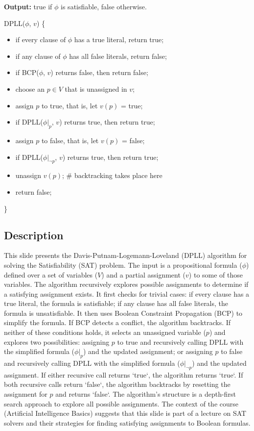 \documentclass{article}%
\begin{document}
\textbf{Output:} true if $\phi$ is satisfiable, false otherwise.

DPLL($\phi$, $v$) \{
\begin{itemize}
    \item if every clause of $\phi$ has a true literal, return true;
    \item if any clause of $\phi$ has all false literals, return false;
    \item if BCP($\phi$, $v$) returns false, then return false;
    \item choose an $p \in V$ that is unassigned in $v$;
    \item assign $p$ to true, that is, let $v(p)$ = true;
    \item if DPLL($\phi|_p$, $v$) returns true, then return true;
    \item assign $p$ to false, that is, let $v(p)$ = false;
    \item if DPLL($\phi|_{\neg p}$, $v$) returns true, then return true;
    \item unassign $v(p)$;  \# backtracking takes place here
    \item return false;
\end{itemize}
\}
%
\subsection{Description}%
This slide presents the Davis-Putnam-Logemann-Loveland (DPLL) algorithm for solving the Satisfiability (SAT) problem.  The input is a propositional formula ($\phi$) defined over a set of variables ($V$) and a partial assignment ($v$) to some of those variables.  The algorithm recursively explores possible assignments to determine if a satisfying assignment exists.  It first checks for trivial cases: if every clause has a true literal, the formula is satisfiable; if any clause has all false literals, the formula is unsatisfiable.  It then uses Boolean Constraint Propagation (BCP) to simplify the formula. If BCP detects a conflict, the algorithm backtracks.  If neither of these conditions holds, it selects an unassigned variable ($p$) and explores two possibilities: assigning $p$ to true and recursively calling DPLL with the simplified formula ($\phi|_p$) and the updated assignment; or assigning $p$ to false and recursively calling DPLL with the simplified formula ($\phi|_{\neg p}$) and the updated assignment.  If either recursive call returns `true`, the algorithm returns `true`.  If both recursive calls return `false`, the algorithm backtracks by resetting the assignment for $p$ and returns `false`.  The algorithm's structure is a depth-first search approach to explore all possible assignments.  The context of the course (Artificial Intelligence Basics) suggests that this slide is part of a lecture on SAT solvers and their strategies for finding satisfying assignments to Boolean formulas.%
\end{document}
